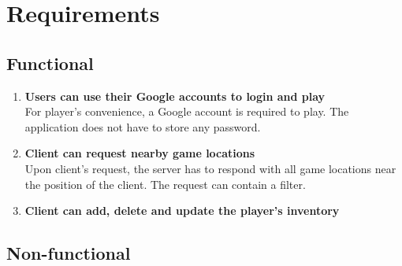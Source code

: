 	
\section{Requirements}

	\subsection{Functional}
		\begin{enumerate}
			\item \textbf{Users can use their Google accounts to login and play} \\
			For player's convenience, a Google account is required to play. The application does not have to store any password. 
			
			\item \textbf{Client can request nearby game locations} \\
			Upon client's request, the server has to respond with all game locations near the position of the client. The request can contain a filter.
			
			\item \textbf{Client can add, delete and update the player's inventory} \\
		\end{enumerate}
		
		
	\subsection{Non-functional}
	
